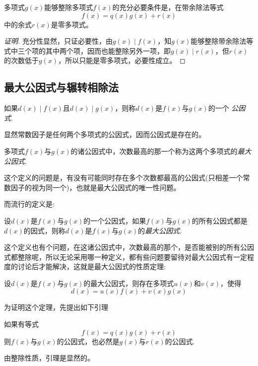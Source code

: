 \begin{theorem}
  多项式$g(x)$能够整除多项式$f(x)$的充分必要条件是，在带余除法等式
  \[ f(x)=q(x)g(x)+r(x) \]
  中的余式$r(x)$是零多项式。
\end{theorem}

\begin{proof}[证明]
  充分性显然，只证必要性，由$g(x) \mid f(x)$，知$g(x)$能够整除带余除法等式中三个项的其中两个项，因而也能整除另外一项，即$g(x) \mid r(x)$，但$r(x)$的次数低于$g(x)$，所以只能是零多项式，必要性成立。
\end{proof}

\subsection{最大公因式与辗转相除法}
\label{sec:greatest-common-divisor-and-euclidean-division}

\begin{definition}
  如果$d(x) \mid f(x)$且$d(x) \mid g(x)$，则称$d(x)$是$f(x)$与$g(x)$的一个 \emph{公因式}.
\end{definition}

显然常数因子是任何两个多项式的公因式，因而公因式是存在的。

\begin{definition}
  多项式$f(x)$与$g(x)$的诸公因式中，次数最高的那一个称为这两个多项式的\emph{最大公因式}.
\end{definition}

这个定义的问题是，有没有可能同时存在多个次数都最高的公因式(只相差一个常数因子的视为同一个)，也就是最大公因式的唯一性问题。

而流行的定义是:

\begin{definition}
  设$d(x)$是$f(x)$与$g(x)$的一个公因式，如果$f(x)$与$g(x)$的所有公因式都是$d(x)$的因式，则称$d(x)$是$f(x)$与$g(x)$的\emph{最大公因式}.
\end{definition}

这个定义也有个问题，在这诸公因式中，次数最高的那个，是否能被别的所有公因式都整除呢，所以无论采用哪一种定义，都有些问题要留待对最大公因式有一定程度的讨论后才能解决，这就是最大公因式的性质定理:

\begin{theorem}[最大公因式性质定理]
  \label{theorem:greatest-factor-polynome-property}
  设$d(x)$是$f(x)$与$g(x)$的最大公因式，则存在多项式$u(x)$和$v(x)$，使得
  \[ d(x) = u(x)f(x) + v(x)g(x) \]
\end{theorem}

为证明这个定理，先提出如下引理
\begin{lemma}
  如果有等式
  \[ f(x)=q(x)g(x)+r(x) \]
  则$f(x)$与$g(x)$的公因式，也必然是$g(x)$与$r(x)$的公因式.
\end{lemma}
由整除性质，引理是显然的。

